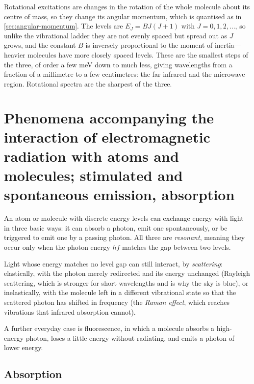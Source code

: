         Rotational excitations are changes in the rotation of the whole molecule about its centre of mass, so they change its angular momentum, which is quantised as in \cref{sec:angular-momentum}. The levels are $E_{J} = BJ(J+1)$ with $J = 0,1,2,\dots$, so unlike the vibrational ladder they are not evenly spaced but spread out as $J$ grows, and the constant $B$ is inversely proportional to the moment of inertia---heavier molecules have more closely spaced levels. These are the smallest steps of the three, of order a few \unit{\milli\electronvolt} down to much less, giving wavelengths from a fraction of a millimetre to a few centimetres: the far infrared and the microwave region. Rotational spectra are the sharpest of the three.

\section{Phenomena accompanying the interaction of electromagnetic radiation with atoms and molecules; stimulated and spontaneous emission, absorption}
\label{sec:light-matter}

    An atom or molecule with discrete energy levels can exchange energy with light in three basic ways: it can absorb a photon, emit one spontaneously, or be triggered to emit one by a passing photon. All three are \emph{resonant}, meaning they occur only when the photon energy $hf$ matches the gap between two levels.

    Light whose energy matches no level gap can still interact, by \emph{scattering}: elastically, with the photon merely redirected and its energy unchanged (Rayleigh scattering, which is stronger for short wavelengths and is why the sky is blue), or inelastically, with the molecule left in a different vibrational state so that the scattered photon has shifted in frequency (the \emph{Raman effect}, which reaches vibrations that infrared absorption cannot).

    A further everyday case is fluorescence, in which a molecule absorbs a high-energy photon, loses a little energy without radiating, and emits a photon of lower energy.

    \subsection{Absorption}

